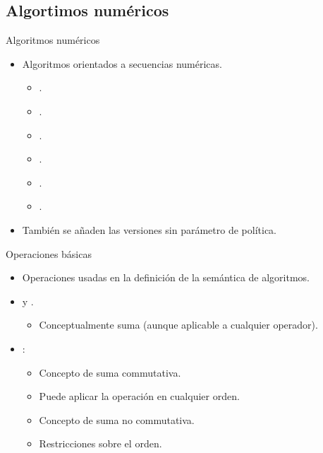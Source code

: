 \subsection{Algortimos numéricos}

\begin{frame}[t]{Algoritmos numéricos}
\begin{itemize}
  \item Algoritmos orientados a secuencias numéricas.
    \begin{itemize}
      \item {}.
      \item {}.
      \item {}.
      \item {}.
      \item {}.
      \item {}.
    \end{itemize}
  \vfill
  \item También se añaden las versiones sin parámetro de política.
\end{itemize}
\end{frame}

\begin{frame}[t]{Operaciones básicas}
\begin{itemize}
  \item Operaciones usadas en la definición de la semántica de algoritmos.
  \item {} y .
    \begin{itemize}
      \item Conceptualmente suma (aunque aplicable a cualquier operador).
    \end{itemize}
  \item {}:
    \begin{itemize}
      \item Concepto de suma commutativa.
      \item Puede aplicar la operación en cualquier orden.
    \end{itemize}
    \begin{itemize}
      \item Concepto de suma no commutativa.
      \item Restricciones sobre el orden.
    \end{itemize}
\end{itemize}
\end{frame}


